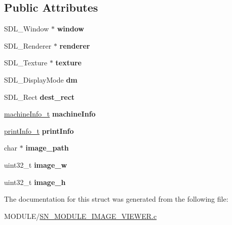 \subsection*{Public Attributes}
\begin{DoxyCompactItemize}
\item 
\mbox{\label{structimage__viewer_a7aa8ff90430ce37f77e0473fef98acfb}} 
S\+D\+L\+\_\+\+Window $\ast$ {\bfseries window}
\item 
\mbox{\label{structimage__viewer_a15c11d0e9c16bb8cd2e66e533d29bf49}} 
S\+D\+L\+\_\+\+Renderer $\ast$ {\bfseries renderer}
\item 
\mbox{\label{structimage__viewer_abd3a6500c6dc389627ca4d88cb688d81}} 
S\+D\+L\+\_\+\+Texture $\ast$ {\bfseries texture}
\item 
\mbox{\label{structimage__viewer_ad1877e4b3d773918f73da8d8132e3a71}} 
S\+D\+L\+\_\+\+Display\+Mode {\bfseries dm}
\item 
\mbox{\label{structimage__viewer_ab8b67fbf6967a2b072e7ceec0ad002c0}} 
S\+D\+L\+\_\+\+Rect {\bfseries dest\+\_\+rect}
\item 
\mbox{\label{structimage__viewer_ae34bb6294b7789eaaa37a917592d0a2c}} 
\hyperlink{structmachine__information}{machine\+Info\+\_\+t} {\bfseries machine\+Info}
\item 
\mbox{\label{structimage__viewer_a3f7d3425748942aaceb6dc66408d6355}} 
\hyperlink{structprint__information}{print\+Info\+\_\+t} {\bfseries print\+Info}
\item 
\mbox{\label{structimage__viewer_a39e8828eae966bbc9cf65e2a681ca9e7}} 
char $\ast$ {\bfseries image\+\_\+path}
\item 
\mbox{\label{structimage__viewer_a55eb5d93ecd1e3a138d64b5d158980b0}} 
uint32\+\_\+t {\bfseries image\+\_\+w}
\item 
\mbox{\label{structimage__viewer_aca799b98d1db4a741969dd24ecac358a}} 
uint32\+\_\+t {\bfseries image\+\_\+h}
\end{DoxyCompactItemize}


The documentation for this struct was generated from the following file\+:\begin{DoxyCompactItemize}
\item 
M\+O\+D\+U\+L\+E/\hyperlink{SN__MODULE__IMAGE__VIEWER_8c}{S\+N\+\_\+\+M\+O\+D\+U\+L\+E\+\_\+\+I\+M\+A\+G\+E\+\_\+\+V\+I\+E\+W\+E\+R.\+c}\end{DoxyCompactItemize}
